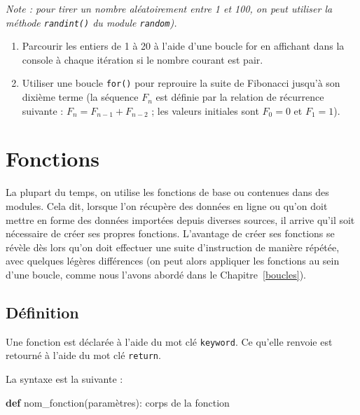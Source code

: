 \documentclass[12pt,]{book}
\newenvironment{Shaded}{\begin{snugshade}}{\end{snugshade}}
\newcommand{\KeywordTok}[1]{\textcolor[rgb]{0.13,0.29,0.53}{\textbf{#1}}}
\newcommand{\NormalTok}[1]{#1}
\providecommand{\tightlist}{%
  \setlength{\itemsep}{0pt}\setlength{\parskip}{0pt}}
\numberwithin{equation}{section}
\numberwithin{countremarque}{section}
\begin{document}
\emph{Note : pour tirer un nombre aléatoirement entre 1 et 100, on peut
utiliser la méthode \texttt{randint()} du module \texttt{random}).}

\begin{enumerate}
\def\labelenumi{\arabic{enumi}.}
\setcounter{enumi}{2}
\tightlist
\item
  Parcourir les entiers de 1 à 20 à l'aide d'une boucle for en affichant
  dans la console à chaque itération si le nombre courant est pair.
\item
  Utiliser une boucle \texttt{for()} pour reprouire la suite de
  Fibonacci jusqu'à son dixième terme (la séquence \(F_n\) est définie
  par la relation de récurrence suivante : \(F_n = F_{n-1} + F_{n-2}\) ;
  les valeurs initiales sont \(F_0 = 0\) et \(F_1 = 1\)).
\end{enumerate}

\chapter{Fonctions}\label{fonctions}

La plupart du temps, on utilise les fonctions de base ou contenues dans
des modules. Cela dit, lorsque l'on récupère des données en ligne ou
qu'on doit mettre en forme des données importées depuis diverses
sources, il arrive qu'il soit nécessaire de créer ses propres fonctions.
L'avantage de créer ses fonctions se révèle dès lors qu'on doit
effectuer une suite d'instruction de manière répétée, avec quelques
légères différences (on peut alors appliquer les fonctions au sein d'une
boucle, comme nous l'avons abordé dans le Chapitre~\ref{boucles}).

\section{Définition}\label{definition}

Une fonction est déclarée à l'aide du mot clé \texttt{keyword}. Ce
qu'elle renvoie est retourné à l'aide du mot clé \texttt{return}.

La syntaxe est la suivante :

\begin{Shaded}
\begin{Highlighting}[]
\KeywordTok{def}\NormalTok{ nom_fonction(paramètres):}
\NormalTok{  corps de la fonction}
\end{Highlighting}
\end{Shaded}
\end{document}
